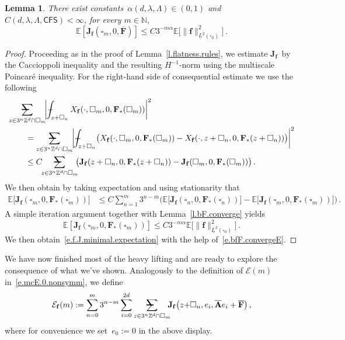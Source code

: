 \documentclass[11pt]{article} %
\makeatletter
\let\oldsquare\square %
\renewcommand{\square}{\oldsquare}
\numberwithin{equation}{section}
\newtheorem{lemma}[theorem]{Lemma}
\theoremstyle{definition}
\newcommand*{\N}{\ensuremath{\mathbb{N}}}
\newcommand*{\Z}{\ensuremath{\mathbb{Z}}}
\newcommand{\f}{\mathbf{f}}
\newcommand{\cu}{\square}
\newcommand{\E}{\mathbb{E}}
\newcommand{\X}{\mathcal{X}}
\renewcommand{\O}{\mathcal{O}}
\newcommand{\avsum}{\mathop{\mathpalette\avsuminner\relax}\displaylimits}
\newcommand\avsuminner[2]{%
  {\sbox0{$\m@th#1\sum$}%
   \vphantom{\usebox0}%
   \ooalign{%
     \hidewidth
     \smash{\,\rule[.23em]{8.8pt}{1.1pt} \relax}%
     \hidewidth\cr
     $\m@th#1\sum$\cr
   }%
  }%
}
\def\Xint#1{\mathchoice
{\XXint\displaystyle\textstyle{#1}}%
{\XXint\textstyle\scriptstyle{#1}}%
{\XXint\scriptstyle\scriptscriptstyle{#1}}%
{\XXint\scriptscriptstyle\scriptscriptstyle{#1}}%
\!\int}
\def\XXint#1#2#3{{\setbox0=\hbox{$#1{#2#3}{\int}$}
\vcenter{\hbox{$#2#3$}}\kern-.5\wd0}}
\def\fint{\Xint-}
\newcommand{\CFS}{\mathsf{CFS}}
\newcommand{\bfAhom}{\overline{\mathbf{A}}}
\newcommand{\bfJ}{\mathbf{J}}
\newcommand{\bfF}{\mathbf{F}}
\makeatother
\begin{document}
\begin{lemma} \label{l.f.J.minimal.expectation}
There exist constants~$\alpha(d,\lambda,\Lambda) \in (0,1)$ and~$C(d,\lambda,\Lambda,\CFS) < \infty$, 
for every $m\in\N$, 
\begin{equation}  \label{e.f.J.minimal.expectation}
\E[\bfJ_\f(\cu_{m},0,\overline{\bfF})] \leq C 3^{-m\alpha} \E\bigl[ \| \f \|_{\underline{L}^2(\cu_0)}^2 \bigr]
\,.
\end{equation}
\end{lemma}
\begin{proof}
Proceeding as in the proof of Lemma~\ref{l.flatness.rules}, we estimate $\bfJ_\f$~by the Caccioppoli inequality and the resulting $H^{-1}$-norm using the multiscale Poincar\'e inequality. For the right-hand side of consequential estimate we use the following 
\begin{align} \notag  
\lefteqn{
\avsum_{z \in 3^n \Z^d \cap \cu_m} \!\!  
\bigg| \fint_{z + \cu_n} X_\f(\cdot,\cu_m,0,\bfF_*(\cu_m))  \bigg|^2
} \qquad &
\\ 
\notag 
& =
\avsum_{z \in 3^n \Z^d \cap \cu_m} \!\!  
\bigg|
\fint_{z + \cu_n} \bigl(  X_\f(\cdot,\cu_m,0,\bfF_*(\cu_m)) - X_\f(\cdot,z + \cu_n,0,\bfF_*(z + \cu_n)) \bigr)  
\bigg|^2
\\ \notag & 
\leq 
C \!\!   \avsum_{z \in 3^n \Z^d \cap \cu_m}  \!\!   \bigl( \bfJ_\f(z + \cu_n,0,\bfF_*(z + \cu_n)) - \bfJ_\f(\cu_m,0,\bfF_*(\cu_m)) \bigr)
\,.
\end{align}
We then obtain by taking expectation and using stationarity that 
\begin{align*}  
\E\bigl[ \bfJ_\f(\cu_{m},0,\bfF_*(\cu_{m}))\bigr]
& \leq 
C \sum_{n=1}^m 3^{n-m}  \bigl( \E\bigl[ \bfJ_\f(\cu_n,0,\bfF_*(\cu_n))\bigr] - \E\bigl[  \bfJ_\f(\cu_m,0,\bfF_*(\cu_m)) \bigr] \bigr)
\,.
\end{align*}
A simple iteration argument together with Lemma~\ref{l.bF.converge} yields
\begin{equation*}
\E[\bfJ_\f(\cu_{m},0,\bfF_*(\cu_m))] \leq C 3^{-m\alpha} \E\bigl[ \| \f \|_{\underline{L}^2(\cu_0)}^2 \bigr]\,.
\end{equation*}
We then obtain~\eqref{e.f.J.minimal.expectation} with the help of~\eqref{e.bfF.convergeE}. 
\end{proof}

We have now finished most of the heavy lifting and are ready to explore the consequence of what we've shown. 
Analogously to the definition of $\mathcal{E}(m)$ in~\eqref{e.mcE.0.nonsymm}, we define
\begin{equation} 
\label{e.mathcalE.f}
\mathcal{E}_\f(m)
:= 
\sum_{n=0}^{m} 3^{n-m} \sum_{i=0}^{2d} \avsum_{z \in 3^n \Z^d \cap \cu_m} \!\!\! \bfJ_\f\bigl(z{+}\cu_n,e_i, \bfAhom e_i+ \overline{\bfF}\bigr)  \,,
\end{equation}
where for convenience we set~$e_0 :=0$ in the above display. 
\end{document}
